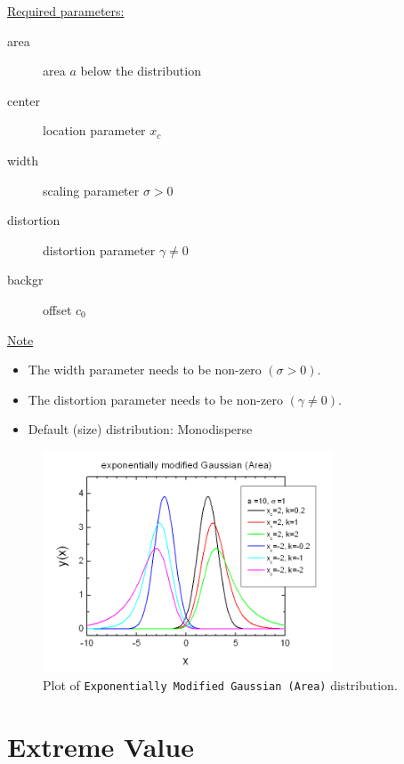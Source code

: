 \vspace{5mm}

\uline{Required parameters:}
\begin{description}
    \item[area] area $a$ below the distribution
    \item[center] location parameter $x_c$
    \item[width] scaling parameter $\sigma> 0$
    \item[distortion] distortion parameter $\gamma\neq 0$
    \item[backgr] offset $c_0$
\end{description}

\uline{Note}
\begin{itemize}
  \item The width parameter needs to be non-zero $(\sigma> 0)$.
  \item The distortion parameter needs to be non-zero $(\gamma \neq 0)$.
  \item Default (size) distribution: Monodisperse
\end{itemize}
\begin{figure}[htb]
\begin{center}
\includegraphics[width=0.768\textwidth]{EMGArea.png}
\end{center}
\caption{Plot of \texttt{Exponentially Modified Gaussian (Area)} distribution.}
\label{fig:EMGArea}
\end{figure}

\clearpage

\section{Extreme Value} ~\\
\label{sec:ExtremeValue}
